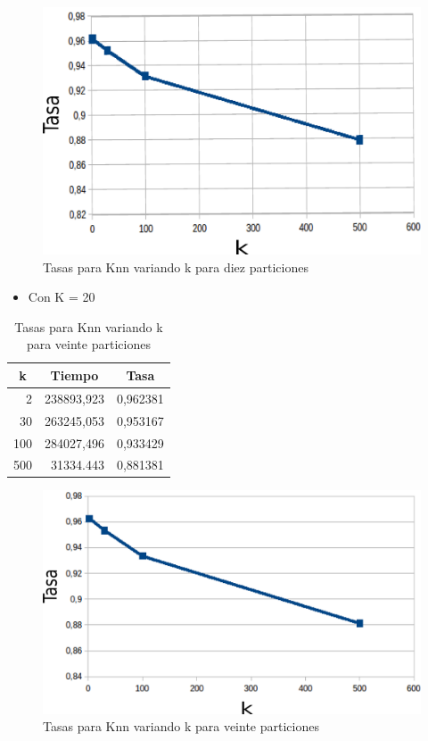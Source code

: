     \begin{figure}[H]
    \centering
    \includegraphics[scale=0.3]{Graficos/knnTasa10.png}
    \caption{Tasas para Knn variando k para diez particiones}
	\label{knnTasa10}
    \end{figure}
\bigskip
\bigskip
\bigskip




\begin{itemize}
\item Con K = 20\\
\end{itemize} 

\begin{table}[H]
\centering
\begin{tabular}{|r|r|r|}
\hline
\multicolumn{1}{|c|}{k} & \multicolumn{1}{c|}{Tiempo} & \multicolumn{1}{c|}{Tasa} \\ \hline
2 & 238893,923 & 0,962381 \\ \hline
30 & 263245,053 & 0,953167 \\ \hline
100 & 284027,496 & 0,933429 \\ \hline
500 & 31334.443 & 0,881381 \\ \hline
\end{tabular}
 \caption{Tasas para Knn variando k para veinte particiones}
\label{}
\end{table}
\bigskip
\bigskip
\bigskip

    \begin{figure}[H]
    \centering
    \includegraphics[scale=0.3]{Graficos/knnTasa20.png}
    \caption{Tasas para Knn variando k para veinte particiones}
	\label{knnTasa20}
    \end{figure}
\bigskip
\bigskip

